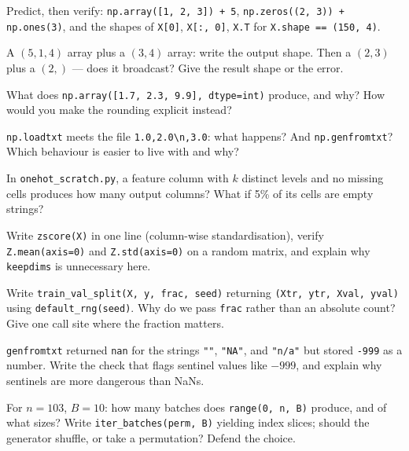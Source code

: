 \begin{exercise}[easy]
Predict, then verify: \texttt{np.array([1, 2, 3]) + 5},
\texttt{np.zeros((2, 3)) + np.ones(3)}, and the shapes of
\texttt{X[0]}, \texttt{X[:, 0]}, \texttt{X.T} for \texttt{X.shape == (150, 4)}.
\end{exercise}
\begin{exercise}[easy]
A $(5,1,4)$ array plus a $(3,4)$ array: write the output shape. Then a
$(2,3)$ plus a $(2,)$ --- does it broadcast? Give the result shape or the
error.
\end{exercise}
\begin{exercise}[easy]
What does \texttt{np.array([1.7, 2.3, 9.9], dtype=int)} produce, and why?
How would you make the rounding explicit instead?
\end{exercise}
\begin{exercise}[easy]
\texttt{np.loadtxt} meets the file \texttt{1.0,2.0\textbackslash n,3.0}:
what happens? And \texttt{np.genfromtxt}? Which behaviour is easier to live
with and why?
\end{exercise}
\begin{exercise}[easy]
In \texttt{onehot\_scratch.py}, a feature column with $k$ distinct levels and
no missing cells produces how many output columns? What if 5\% of its cells
are empty strings?
\end{exercise}
\begin{exercise}[medium]
Write \texttt{zscore(X)} in one line (column-wise standardisation), verify
\texttt{Z.mean(axis=0)} and \texttt{Z.std(axis=0)} on a random matrix, and
explain why \texttt{keepdims} is unnecessary here.
\end{exercise}
\begin{exercise}[medium]
Write \texttt{train\_val\_split(X, y, frac, seed)} returning
\texttt{(Xtr, ytr, Xval, yval)} using \texttt{default\_rng(seed)}. Why do we
pass \texttt{frac} rather than an absolute count? Give one call site where the
fraction matters.
\end{exercise}
\begin{exercise}[medium]
\texttt{genfromtxt} returned \texttt{nan} for the strings \texttt{""},
\texttt{"NA"}, and \texttt{"n/a"} but stored \texttt{-999} as a number.
Write the check that flags sentinel values like $-999$, and explain why
sentinels are more dangerous than NaNs.
\end{exercise}
\begin{exercise}[medium]
For $n=103$, $B=10$: how many batches does \texttt{range(0, n, B)} produce,
and of what sizes? Write \texttt{iter\_batches(perm, B)} yielding index
slices; should the generator shuffle, or take a permutation? Defend the
choice.
\end{exercise}
